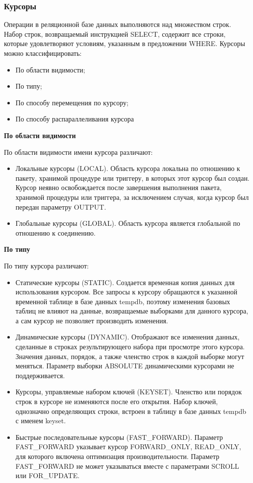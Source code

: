 \subsubsection{Курсоры}
Операции в реляционной базе данных выполняются над множеством строк. Набор строк,
возвращаемый инструкцией SELECT, содержит все строки, которые удовлетворяют
условиям, указанным в предложении WHERE.
Курсоры можно классифицировать:
\begin{itemize}
	\item По области видимости;
	\item По типу;
	\item По способу перемещения по курсору;
	\item По способу распараллеливания курсора
\end{itemize}

\textbf{По области видимости}

По области видимости имени курсора различают:
\begin{itemize}
	\item Локальные курсоры (LOCAL). Область курсора локальна по отношению к пакету,
	хранимой процедуре или триггеру, в которых этот курсор был создан. Курсор неявно
	освобождается после завершения выполнения пакета, хранимой процедуры или триггера, за
	исключением случая, когда курсор был передан параметру OUTPUT.
	\item Глобальные курсоры (GLOBAL). Область курсора является глобальной по отношению к
	соединению.
\end{itemize}

\textbf{По типу}

По типу курсора различают:
\begin{itemize}
	\item Статические курсоры (STATIC). Создается временная копия данных для использования курсором. Все запросы к
	курсору обращаются к указанной временной таблице в базе данных tempdb, поэтому изменения базовых таблиц
	не влияют на данные, возвращаемые выборками для данного курсора, а сам курсор не позволяет производить
	изменения.
	\item Динамические курсоры (DYNAMIC). Отображают все изменения данных, сделанные в строках
	результирующего набора при просмотре этого курсора. Значения данных, порядок, а также членство строк в
	каждой выборке могут меняться. Параметр выборки ABSOLUTE динамическими курсорами не поддерживается.
	\item Курсоры, управляемые набором ключей (KEYSET). Членство или порядок строк в курсоре не изменяются после
	его открытия. Набор ключей, однозначно определяющих строки, встроен в таблицу в базе данных tempdb с
	именем keyset.
	\item Быстрые последовательные курсоры (FAST\_FORWARD). Параметр FAST\_FORWARD указывает курсор
	FORWARD\_ONLY, READ\_ONLY, для которого включена оптимизация производительности. Параметр
	FAST\_FORWARD не может указываться вместе с параметрами SCROLL или FOR\_UPDATE. 
\end{itemize}

